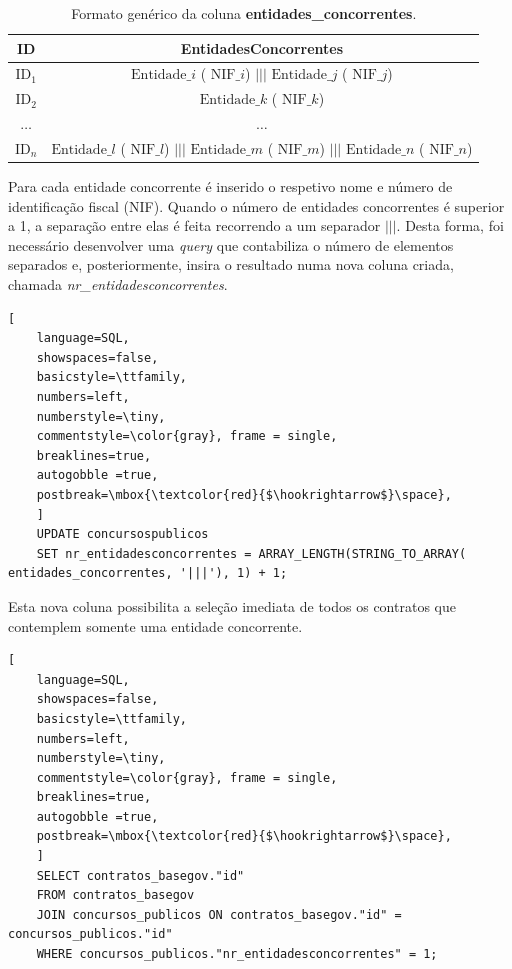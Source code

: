 \begin{table}[H]
	\centering
	\begin{tabular}{|c|c|}
		\hline
		\textbf{ID}   & \textbf{EntidadesConcorrentes}                                                                                                      \\ \hline
		$\text{ID}_1$ & $\text{Entidade}\_i$ ( $\text{NIF}\_i$) $|||$ $\text{Entidade}\_j$ ( $\text{NIF}\_j$)                                               \\ \hline
		$\text{ID}_2$ & $\text{Entidade}\_k$ ( $\text{NIF}\_k$)                                                                                             \\ \hline
		$\dots$       & $\dots$                                                                                                                             \\ \hline
		$\text{ID}_n$ & $\text{Entidade}\_l$ ( $\text{NIF}\_l$) $|||$ $\text{Entidade}\_m$ ( $\text{NIF}\_m$) $|||$ $\text{Entidade}\_n$ ( $\text{NIF}\_n$) \\ \hline
	\end{tabular}
	\caption{Formato genérico da coluna \textbf{entidades\_concorrentes}.}
	\label{tab:entsconc}
\end{table}

Para cada entidade concorrente é inserido o respetivo nome e número de identificação fiscal (NIF). Quando o número de entidades concorrentes é superior a 1, a separação entre elas é feita recorrendo a um separador $|||$. Desta forma, foi necessário desenvolver uma \textit{query} que contabiliza o número de elementos separados e, posteriormente, insira o resultado numa nova coluna criada, chamada \textit{nr\_entidadesconcorrentes}.


\begin{lstlisting}[
	language=SQL,
	showspaces=false,
	basicstyle=\ttfamily,
	numbers=left,
	numberstyle=\tiny,
	commentstyle=\color{gray}, frame = single,
	breaklines=true,
	autogobble =true,
	postbreak=\mbox{\textcolor{red}{$\hookrightarrow$}\space},
	]
	UPDATE concursospublicos
	SET nr_entidadesconcorrentes = ARRAY_LENGTH(STRING_TO_ARRAY( entidades_concorrentes, '|||'), 1) + 1;	
\end{lstlisting}

Esta nova coluna possibilita a seleção imediata de todos os contratos que contemplem somente uma entidade concorrente.

\begin{lstlisting}[
	language=SQL,
	showspaces=false,
	basicstyle=\ttfamily,
	numbers=left,
	numberstyle=\tiny,
	commentstyle=\color{gray}, frame = single,
	breaklines=true,
	autogobble =true,
	postbreak=\mbox{\textcolor{red}{$\hookrightarrow$}\space},
	]
	SELECT contratos_basegov."id"
	FROM contratos_basegov
	JOIN concursos_publicos ON contratos_basegov."id" = concursos_publicos."id"
	WHERE concursos_publicos."nr_entidadesconcorrentes" = 1;
\end{lstlisting}


